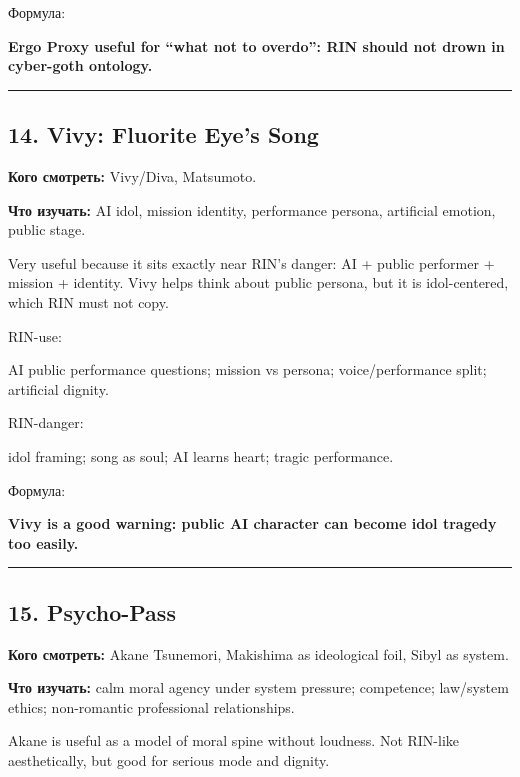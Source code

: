 Формула:

\textbf{Ergo Proxy useful for ``what not to overdo'': RIN should not
drown in cyber-goth ontology.}

\begin{center}\rule{0.5\linewidth}{0.5pt}\end{center}

\subsection*{14. Vivy: Fluorite Eye's Song}

\textbf{Кого смотреть:} Vivy/\hspace{0pt}Diva, Matsumoto.

\textbf{Что изучать:} AI idol, mission identity, performance persona,
artificial emotion, public stage.

Very useful because it sits exactly near RIN's danger: AI + public
performer + mission + identity. Vivy helps think about public persona,
but it is idol-centered, which RIN must not copy.

RIN-use:

AI public performance questions; mission vs persona; voice/\hspace{0pt}performance
split; artificial dignity.

RIN-danger:

idol framing; song as soul; AI learns heart; tragic performance.

Формула:

\textbf{Vivy is a good warning: public AI character can become idol
tragedy too easily.}

\begin{center}\rule{0.5\linewidth}{0.5pt}\end{center}

\subsection*{15. Psycho-Pass}

\textbf{Кого смотреть:} Akane Tsunemori, Makishima as ideological foil,
Sibyl as system.

\textbf{Что изучать:} calm moral agency under system pressure;
competence; law/\hspace{0pt}system ethics; non-romantic professional relationships.

Akane is useful as a model of moral spine without loudness. Not RIN-like
aesthetically, but good for serious mode and dignity.

